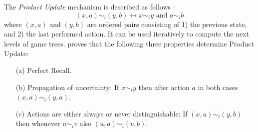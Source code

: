 The \emph{Product Update} mechanism is described as follows \cite{benthem2001a}:
$$
(x,a)\sim_i(y,b) \leftrightarrow x\sim_i y \mbox{ and } a\sim_i b
$$
where $(x,a)$ and $(y,b)$ are ordered pairs consisting of 1) the previous state, and 2) the last performed action. It can be used iteratively to compute the next levels of game trees. \cite{benthem2001a} proves that the following three properties determine Product Update:
\begin{enumerate}
\item[(a)] Perfect Recall.
\item[(b)] Propagation of uncertainty: If $x\sim_i y$ then after action $a$ in both cases $(x,a)\sim_i (y,a)$.
\item[(c)] Actions are either always or never distinguishable: If $(x,a)\sim_i (y,b)$ then whenever $u\sim_i v$ also $(u,a)\sim_i (v,b)$.
\end{enumerate}